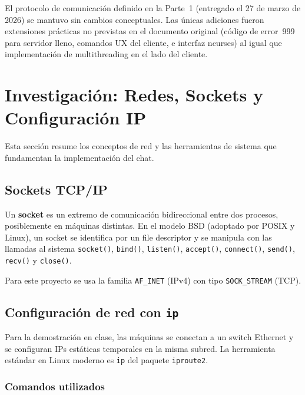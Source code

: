 \documentclass[12pt,a4paper]{article}
\begin{document}
El protocolo de comunicación definido en la Parte~1 (entregado el 27 de marzo de
2026) se mantuvo sin cambios conceptuales. Las únicas adiciones fueron extensiones
prácticas no previstas en el documento original (código de error~999 para servidor
lleno, comandos UX del cliente, e interfaz ncurses) al igual que implementación de
multithreading en el lado del cliente.

\section{Investigación: Redes, Sockets y Configuración IP}
\label{sec:investigacion}

Esta sección resume los conceptos de red y las herramientas de sistema que
fundamentan la implementación del chat.

\subsection{Sockets TCP/IP}

Un \textbf{socket} es un extremo de comunicación bidireccional entre dos procesos,
posiblemente en máquinas distintas.  En el modelo BSD (adoptado por POSIX y Linux),
un socket se identifica por un file descriptor y se manipula con las llamadas al
sistema \texttt{socket()}, \texttt{bind()}, \texttt{listen()}, \texttt{accept()},
\texttt{connect()}, \texttt{send()}, \texttt{recv()} y \texttt{close()}.

Para este proyecto se usa la familia \texttt{AF\_INET} (IPv4) con tipo
\texttt{SOCK\_STREAM} (TCP).

\subsection{Configuración de red con \texttt{ip}}

Para la demostración en clase, las máquinas se conectan a un switch Ethernet y se
configuran IPs estáticas temporales en la misma subred.  La herramienta estándar en
Linux moderno es \texttt{ip} del paquete \texttt{iproute2}.

\subsubsection{Comandos utilizados}
\end{document}
